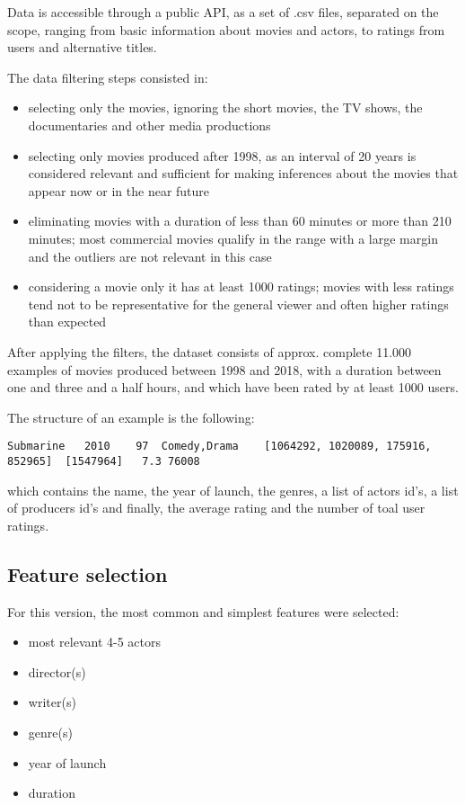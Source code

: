 \documentclass[a4paper,10pt]{article}
\begin{document}
Data is accessible through a public API, as a set of .csv files, separated on the scope, ranging from basic information about movies and actors, to ratings from users and alternative titles.

The data filtering steps consisted in:
\begin{itemize}
	\item selecting only the movies, ignoring the short movies, the TV shows, the documentaries and other media productions
	\item selecting only movies produced after 1998, as an interval of 20 years is considered relevant and sufficient for making inferences about the movies that appear now or in the near future
	\item eliminating movies with a duration of less than 60 minutes or more than 210 minutes; most commercial movies qualify in the range with a large margin and the outliers are not relevant in this case  
	\item considering a movie only it has at least 1000 ratings; movies with less ratings tend not to be representative for the general viewer and often higher ratings than expected
\end{itemize}
	
After applying the filters, the dataset consists of approx. complete 11.000 examples of movies produced between 1998 and 2018, with a duration between one and three and a half  hours, and which have been rated by at least 1000 users.

The structure of an example is the following:

\begin{verbatim}
Submarine	2010	97	Comedy,Drama	[1064292, 1020089, 175916, 852965]	[1547964]	7.3	76008
\end{verbatim}

which contains the name, the year of launch, the genres, a list of actors id's, a list of producers id's and finally, the average rating and the number of toal user ratings.

\subsection{Feature selection}
For this version, the most common and simplest features were selected:
\begin{itemize}
	\item most relevant 4-5 actors
	\item director(s)
	\item writer(s)
	\item genre(s)
	\item year of launch
	\item duration
\end{itemize}
\end{document}
